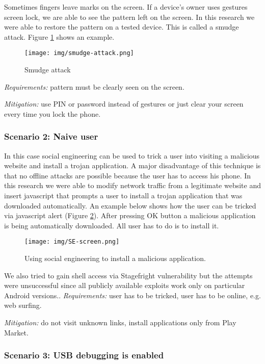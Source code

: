 Sometimes fingers leave marks on the screen. If a device’s owner uses gestures screen lock, we are able to see the pattern left on the screen. In this research we were able to restore the pattern on a tested device. This is called a smudge attack. Figure \ref{pic:smudge} shows an example.

\begin{figure}[!ht]
\centering
\texttt{[image: img/smudge-attack.png]}
\caption{Smudge attack}
\label{pic:smudge}
\end{figure}


\textsl{Requirements:} pattern must be clearly seen on the screen.

\textsl{Mitigation:} use PIN or password instead of gestures or just clear your screen every time you lock the phone.


\subsubsection{Scenario 2: Naive user}
In this case social engineering can be used to trick a user into visiting a malicious website and install a trojan application. A major disadvantage of this technique is that no offline attacks are possible because the user has to access his phone. In this research we were able to modify network traffic from a legitimate website and insert javascript that prompts a user to install a trojan application that was downloaded automatically.
An example below shows how the user can be tricked via javascript alert (Figure \ref{pic:social}). After pressing OK button a malicious application is being automatically downloaded. All user has to do is to install it.

\begin{figure}[!ht]
\centering
\texttt{[image: img/SE-screen.png]}
\caption{Using social engineering to install a malicious application.}
\label{pic:social}
\end{figure}


We also tried to gain shell access via Stagefright vulnerability but the attempts were unsuccessful since all publicly available exploits work only on particular Android versions..
\textsl{Requirements:} user has to be tricked, user has to be online, e.g. web surfing.

\textsl{Mitigation:} do not visit unknown links, install applications only from Play Market.


\subsubsection{Scenario 3: USB debugging is enabled}

